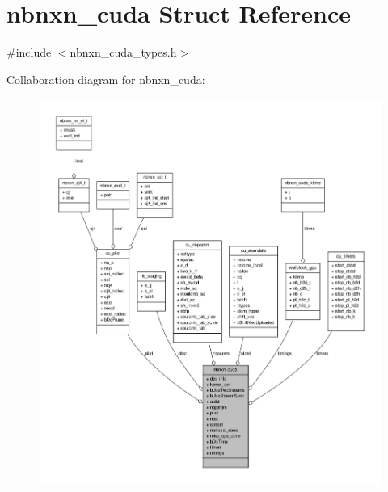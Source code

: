 \hypertarget{structnbnxn__cuda}{\section{nbnxn\-\_\-cuda \-Struct \-Reference}
\label{structnbnxn__cuda}
}


{\ttfamily \#include $<$nbnxn\-\_\-cuda\-\_\-types.\-h$>$}



\-Collaboration diagram for nbnxn\-\_\-cuda\-:
\nopagebreak
\begin{figure}[H]
\begin{center}
\leavevmode
\includegraphics[width=350pt]{structnbnxn__cuda__coll__graph}
\end{center}
\end{figure}

